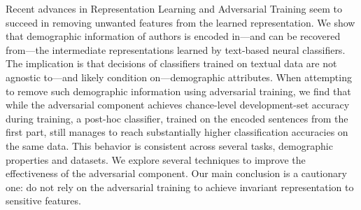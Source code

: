 Recent advances in Representation Learning and Adversarial Training seem to succeed in removing unwanted features from the learned representation. We show that demographic information of authors is encoded in---and can be recovered from---the intermediate representations learned by text-based neural classifiers. The implication is that decisions of classifiers trained on textual data are not agnostic to---and likely condition on---demographic attributes. When attempting to remove such demographic information using adversarial training, we find that while the adversarial component achieves chance-level development-set accuracy during training, a post-hoc classifier, trained on the encoded sentences from the first part, still manages to reach substantially higher classification accuracies on the same data. This behavior is consistent across several tasks, demographic properties and datasets. We explore several techniques to improve the effectiveness of the adversarial component. Our main conclusion is a cautionary one: do not rely on the adversarial training to achieve invariant representation to sensitive features.
